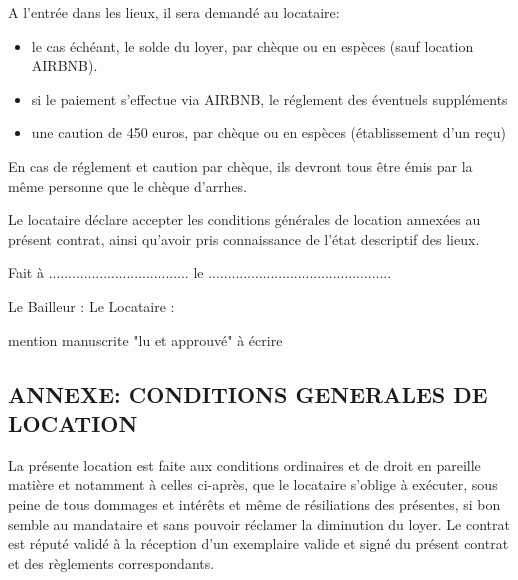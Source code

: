\documentclass[a4paper,11pt]{article}
\begin{document}
\vspace{0.5cm}

A l'entrée dans les lieux, il sera demandé au locataire:
\begin{itemize}
\item le cas échéant, le solde du loyer, par chèque ou en espèces (sauf location AIRBNB).
\item si le paiement s'effectue via AIRBNB, le réglement des éventuels suppléments
\item une caution de 450 euros, par chèque ou en espèces (établissement d'un reçu)
\end{itemize}
En cas de réglement et caution par chèque, ils devront tous être émis par la même personne que le chèque d'arrhes.

\vspace{0.5cm}

Le locataire déclare accepter les conditions générales de location annexées au présent contrat, ainsi qu'avoir pris connaissance de l'état descriptif des lieux.

\vspace{0.5cm}

Fait à .................................... le ...............................................

\vspace{0.5cm}

Le Bailleur : \hspace{3cm}Le Locataire : 

\hspace{5.2cm}mention manuscrite "lu et approuvé" à écrire


\newpage{}




\begin{center}
\section*  { ANNEXE: CONDITIONS GENERALES  DE LOCATION}
\end{center}


\tiny



La présente location est faite aux conditions ordinaires et de droit en pareille matière et notamment à celles ci-après, que le locataire s’oblige à exécuter, sous peine de tous dommages et intérêts et même de résiliations des présentes, si bon semble au mandataire et sans pouvoir réclamer la diminution du loyer.
Le contrat est réputé validé à la réception d’un exemplaire valide et signé du présent contrat et des règlements correspondants.
\end{document}
